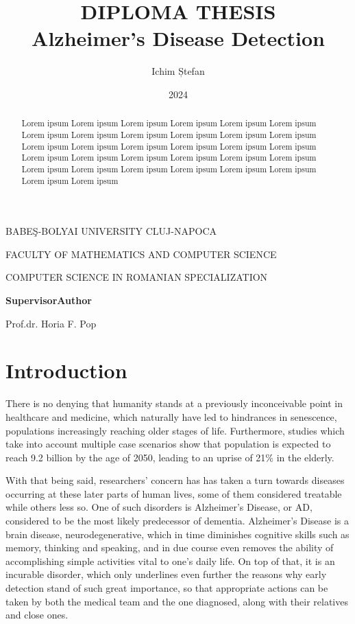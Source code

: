 \documentclass[a4paper, 12pt]{article}
\title{
    DIPLOMA THESIS \\
    Alzheimer's Disease Detection
}
\author{Ichim Ștefan}
\date{2024}
\makeatletter
\renewcommand{\maketitle}{
    \begin{center}
            \normalsize{BABEŞ-BOLYAI UNIVERSITY CLUJ-NAPOCA}\par %
            \normalsize{FACULTY OF MATHEMATICS AND COMPUTER SCIENCE}\par %
            \normalsize{COMPUTER SCIENCE IN ROMANIAN SPECIALIZATION}\par
        \vspace{21em} %

        {\LARGE\@title\par} %
        \vspace{21em} %

        \textbf{Supervisor}\hspace{20em}\textbf{Author}\par
        Prof.dr. Horia F. Pop\hspace{16em}{\large\@author\par} %
        \vspace{3em} %

        {\large\@date\par} %
    \end{center}
}
\makeatother
\begin{document}
\maketitle
\newpage

\begin{abstract}
    Lorem ipsum Lorem ipsum Lorem ipsum Lorem ipsum
    Lorem ipsum Lorem ipsum Lorem ipsum Lorem ipsum
    Lorem ipsum Lorem ipsum Lorem ipsum Lorem ipsum
    Lorem ipsum Lorem ipsum Lorem ipsum Lorem ipsum
    Lorem ipsum Lorem ipsum Lorem ipsum Lorem ipsum
    Lorem ipsum Lorem ipsum Lorem ipsum Lorem ipsum
    Lorem ipsum Lorem ipsum Lorem ipsum Lorem ipsum
    Lorem ipsum Lorem ipsum Lorem ipsum Lorem ipsum
\end{abstract}
\newpage

\tableofcontents
\newpage

\section{Introduction}
There is no denying that humanity stands at a previously inconceivable point in healthcare and medicine,
which naturally have led to hindrances in senescence, populations increasingly reaching older stages of life.
Furthermore, studies which take into account multiple case scenarios show that population is expected to reach
9.2 billion by the age of 2050, leading to an uprise of 21\% in the elderly. \cite{KC2017181}

With that being said, researchers' concern has has taken a turn towards diseases occurring at these later
parts of human lives, some of them considered treatable while others less so.
One of such disorders is Alzheimer's Disease, or AD, considered to be the most likely predecessor of dementia.
Alzheimer's Disease is a brain disease, neurodegenerative, which in time diminishes cognitive skills such as memory,
thinking and speaking, and in due course even removes the ability of accomplishing simple activities vital to one's
daily life.
On top of that, it is an incurable disorder, which only underlines even further the reasons why early
detection stand of such great importance, so that appropriate actions can be taken by both the medical team
and the one diagnosed, along with their relatives and close ones.
\end{document}
